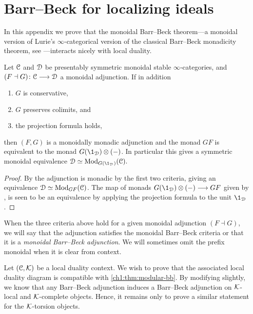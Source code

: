 

\section{Barr--Beck for localizing ideals}
\label{ch1:app:barr-beck}

In this appendix we prove that the monoidal Barr--Beck theorem---a monoidal version of Lurie's $\infty$-categorical version of the classical Barr--Beck monadicity theorem, see \cite[Section 4.7]{Lurie_HA}---interacts nicely with local duality.

\begin{theorem}
    \label{ch1:thm:modular-bb}
    Let $\EuScript{C}$ and $\EuScript{D}$ be presentably symmetric monoidal stable $\infty$-categories, and $(F\dashv G)\colon \EuScript{C}\longrightarrow \EuScript{D}$ a monoidal adjunction. If in addition 
    \begin{enumerate}
        \item $G$ is conservative, 
        \item $G$ preserves colimits, and
        \item the projection formula holds,
    \end{enumerate}
    then $(F,G)$ is a monoidally monadic adjunction and the monad $GF$ is equivalent to the monad $G(\1_\D)\otimes (-)$. In particular this gives a symmetric monoidal equivalence $\D\simeq \Mod_{G(\1_\D)}(\C).$
\end{theorem}
\begin{proof}
    By \cite[4.7.3.5]{Lurie_HA} the adjunction is monadic by the first two criteria, giving an equivalence $\EuScript{D}\simeq \mathrm{Mod}_{GF}(\EuScript{C})$. The map of monads $G(\1_\D)\otimes (-)\to GF$ given by \cite[3.6]{elmanto-kolderup_2020}, is seen to be an equivalence by applying the projection formula to the unit $\1_\D$. 
\end{proof}

\begin{definition}
    When the three criteria above hold for a given monoidal adjunction $(F\dashv G)$, we will say that the adjunction satisfies the monoidal Barr--Beck criteria or that it is a \emph{monoidal Barr--Beck adjunction}. We will sometimes omit the prefix monoidal when it is clear from context. 
\end{definition}

Let $(\EuScript{C}, \mathcal{K})$ be a local duality context. We wish to prove that the associated local duality diagram is compatible with \cref{ch1:thm:modular-bb}. By modifying \cite[3.7]{behrens-shaw_2020} slightly, we know that any Barr--Beck adjunction induces a Barr--Beck adjunction on $\mathcal{K}$-local and $\mathcal{K}$-complete objects. Hence, it remains only to prove a similar statement for the $\mathcal{K}$-torsion objects. 

